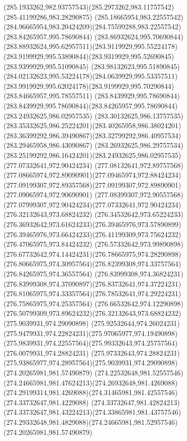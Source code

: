 {{\curveto(285.1933262,982.93757543)(285.2973262,983.11757542)(285.41199286,983.28290875)
\curveto(285.18665954,983.22557542)(284.96665954,983.20424209)(284.75599288,983.22557542)
\moveto(283.84265957,995.78690844)
\curveto(283.86932624,995.70690844)(283.88932624,995.62957511)(283.9119929,995.55224178)
\curveto(283.9199929,995.53890844)(283.9319929,995.52690845)(283.9399929,995.51090845)
\curveto(283.98132623,995.51890845)(284.02132623,995.53224178)(284.0639929,995.53357511)
\curveto(283.9919929,995.62024178)(283.9199929,995.70290844)(283.84665957,995.78557511)
\curveto(283.8439929,995.78690844)(283.8439929,995.78690844)(283.84265957,995.78690844)
\moveto(283.24932625,986.02957535)
\curveto(283.30132625,986.13757535)(283.35332625,986.25224201)(283.40265958,986.38024201)
\curveto(283.36399292,986.39490867)(283.32799292,986.40957534)(283.29465958,986.43090867)
\curveto(283.26932625,986.29757534)(283.25199292,986.16424201)(283.24932625,986.02957535)
\moveto(277.07332641,972.90424234)
\curveto(277.08132641,972.89757568)(277.08665974,972.89090901)(277.09465974,972.88424234)
\curveto(277.09199307,972.89357568)(277.09199307,972.89890901)(277.09065974,972.90690901)
\curveto(277.08399307,972.90557568)(277.07999307,972.90424234)(277.07332641,972.90424234)
\moveto(276.32132643,973.68824232)
\curveto(276.34532642,973.65224233)(276.36932642,973.61624233)(276.39465976,973.57890899)
\curveto(276.39465976,973.66424233)(276.41199309,973.75624232)(276.47065975,973.84424232)
\curveto(276.57332642,973.99890898)(276.67732642,974.14424231)(276.78665975,974.28290898)
\curveto(276.80665975,974.30957564)(276.82399308,974.33757564)(276.84265975,974.36557564)
\curveto(276.83999308,974.36824231)(276.83999308,974.37090897)(276.83732641,974.37224231)
\curveto(276.81065975,974.33357564)(276.78532641,974.29224231)(276.75865975,974.25357564)
\curveto(276.66532642,974.12290898)(276.50799309,973.89624232)(276.32132643,973.68824232)
\moveto(275.9039931,974.29090898)
\curveto(275.92532644,974.26024231)(275.9479931,974.22824231)(275.97065977,974.19490898)
\curveto(275.9839931,974.22557564)(275.99332643,974.25757564)(276.0079931,974.28824231)
\curveto(275.97332643,974.28824231)(275.93865977,974.28957564)(275.9039931,974.29090898)
\moveto(274.20265981,981.57490879)
\curveto(274.22532648,981.52557546)(274.24665981,981.47624213)(274.26932648,981.4269088)
\curveto(274.29199314,981.4269088)(274.31465981,981.42557546)(274.33732647,981.4229088)
\curveto(274.33732647,981.42824213)(274.33732647,981.43224213)(274.33865981,981.43757546)
\curveto(274.29332648,981.4829088)(274.24665981,981.52957546)(274.20265981,981.57490879)
}}

